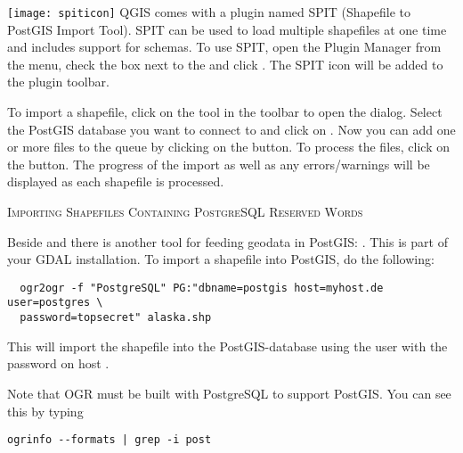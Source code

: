 \texttt{[image: spiticon]} QGIS comes with a
plugin named 
SPIT (Shapefile to PostGIS Import Tool).
SPIT can be used to load multiple shapefiles at one time and includes support
for schemas. To use SPIT, open the Plugin Manager from the 
menu, check the box next to the  and click . The SPIT
icon will be added to the plugin toolbar. 

To import a shapefile, click on the  tool in the 
toolbar to open the 
 dialog. Select the PostGIS database 
you want to connect to and click on . Now you can add one or more 
files to the queue by clicking on the  button. To process the files, 
click on the  button. The progress of the import as well as any 
errors/warnings will be displayed as each shapefile is processed.

\begin{Tip}\caption{\textsc{Importing Shapefiles Containing
PostgreSQL Reserved Words}}
\end{Tip} 

Beside  and  there is another tool for feeding
geodata in PostGIS: . This is part of your GDAL installation.
To import a shapefile into PostGIS, do the following:
\begin{verbatim}
  ogr2ogr -f "PostgreSQL" PG:"dbname=postgis host=myhost.de user=postgres \
  password=topsecret" alaska.shp
\end{verbatim}

This will import the shapefile  into the PostGIS-database
\usertext{postgis}
using the user  with the password  on host
\server{myhost.de}.

Note that OGR must be built with PostgreSQL to support PostGIS.
You can see this by typing
\begin{verbatim}
ogrinfo --formats | grep -i post
\end{verbatim}

